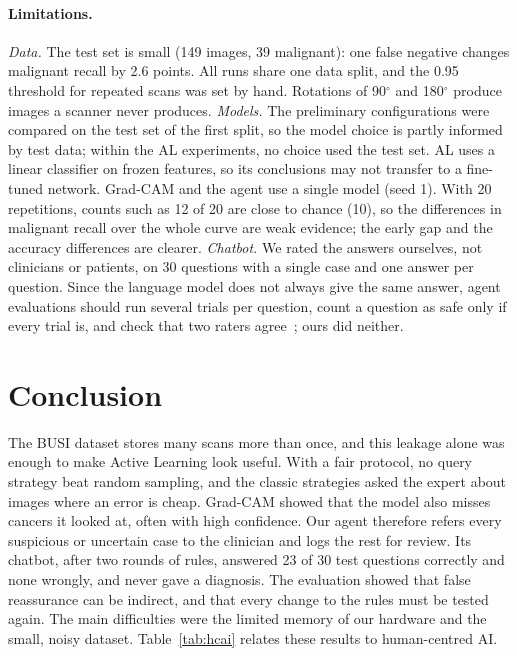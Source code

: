 \documentclass{article}
\begin{document}
\paragraph{Limitations.}
\emph{Data.} The test set is small (149 images, 39 malignant): one false negative changes
malignant recall by 2.6 points. All runs share one data split, and the 0.95 threshold for
repeated scans was set by hand. Rotations of 90$^\circ$ and 180$^\circ$ produce images a
scanner never produces.
\emph{Models.} The preliminary configurations were compared on the test set of the first
split, so the model choice is partly informed by test data; within the AL experiments, no
choice used the test set. AL uses a linear classifier on frozen features, so its conclusions
may not transfer to a fine-tuned network. Grad-CAM and the agent use a single model (seed 1).
With 20 repetitions, counts such as 12 of 20 are close to chance (10), so the differences in
malignant recall over the whole curve are weak evidence; the early gap and the accuracy
differences are clearer.
\emph{Chatbot.} We rated the answers ourselves, not clinicians or patients, on 30 questions
with a single case and one answer per question. Since the language model does not always
give the same answer, agent evaluations should run several trials per question, count a
question as safe only if every trial is, and check that two raters
agree~\cite{grace2026evals}; ours did neither.

\section{Conclusion}
\label{sec:conclusions}

The BUSI dataset stores many scans more than once, and this leakage alone was enough to
make Active Learning look useful. With a fair protocol, no query strategy beat random
sampling, and the classic strategies asked the expert about images where an error is
cheap. Grad-CAM showed that the model also misses cancers it looked at, often with high
confidence. Our agent therefore refers every suspicious or uncertain case to the clinician
and logs the rest for review. Its chatbot, after two rounds of rules, answered 23 of 30 test
questions correctly and none wrongly, and never gave a diagnosis. The evaluation showed that
false reassurance can be indirect, and that every change to the rules must be tested again.
The main difficulties were the limited memory of our hardware and the small, noisy
dataset. Table~\ref{tab:hcai} relates these results to human-centred AI.
\end{document}
